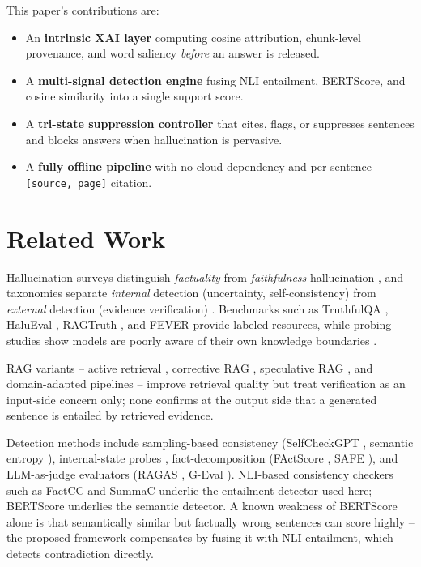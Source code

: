 \documentclass[conference]{IEEEtran}
\begin{document}
This paper's contributions are:
\begin{itemize}
\item An \textbf{intrinsic XAI layer} computing cosine attribution, chunk-level provenance, and word saliency \emph{before} an answer is released.
\item A \textbf{multi-signal detection engine} fusing NLI entailment, BERTScore, and cosine similarity into a single support score.
\item A \textbf{tri-state suppression controller} that cites, flags, or suppresses sentences and blocks answers when hallucination is pervasive.
\item A \textbf{fully offline pipeline} with no cloud dependency and per-sentence \texttt{[source, page]} citation.
\end{itemize}

\section{Related Work}
Hallucination surveys distinguish \emph{factuality} from \emph{faithfulness} hallucination \cite{ji2023survey,huang2025survey}, and taxonomies separate \emph{internal} detection (uncertainty, self-consistency) from \emph{external} detection (evidence verification) \cite{rahman2026survey}. Benchmarks such as TruthfulQA \cite{lin2022truthfulqa}, HaluEval \cite{li2023halueval}, RAGTruth \cite{niu2024ragtruth}, and FEVER \cite{thorne2018fever} provide labeled resources, while probing studies show models are poorly aware of their own knowledge boundaries \cite{petroni2019lama,mallen2023trust,cao2022know}.

RAG variants -- active retrieval \cite{jiang2023flare}, corrective RAG \cite{yan2024crag}, speculative RAG \cite{wang2024speculative}, and domain-adapted pipelines \cite{krainovskikh2026domain} -- improve retrieval quality but treat verification as an input-side concern only; none confirms at the output side that a generated sentence is entailed by retrieved evidence.

Detection methods include sampling-based consistency (SelfCheckGPT \cite{manakul2023selfcheckgpt}, semantic entropy \cite{farquhar2024semantic}), internal-state probes \cite{su2024mind,wang2024activation}, fact-decomposition (FActScore \cite{min2023factscore}, SAFE \cite{wei2024longform}), and LLM-as-judge evaluators (RAGAS \cite{es2024ragas}, G-Eval \cite{liu2023geval}). NLI-based consistency checkers such as FactCC \cite{kryscinski2020factcc} and SummaC \cite{laban2022summac} underlie the entailment detector used here; BERTScore \cite{zhang2020bertscore} underlies the semantic detector. A known weakness of BERTScore alone is that semantically similar but factually wrong sentences can score highly -- the proposed framework compensates by fusing it with NLI entailment, which detects contradiction directly.
\end{document}
